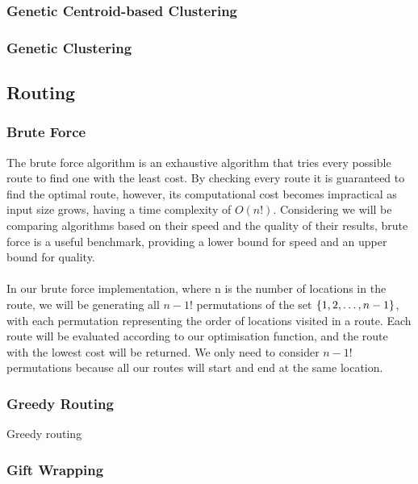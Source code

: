 \subsubsection{Genetic Centroid-based Clustering}
\subsubsection{Genetic Clustering}

\subsection{Routing}\label{subsec:routing}
\subsubsection{Brute Force}\label{subsubsec:brute-force-routing}
The brute force algorithm is an exhaustive algorithm that tries every possible route to find one with the least cost.
By checking every route it is guaranteed to find the optimal route, however, its computational cost becomes
impractical as input size grows, having a time complexity of $O(n!)$.
Considering we will be comparing algorithms based on their speed and the quality of their results, brute force is a
useful benchmark, providing a lower bound for speed and an upper bound for quality.\\
\\
In our brute force implementation, where n is the number of locations in the route, we will be generating all $n-1!$
permutations of the set $\{1, 2, \mathellipsis, n-1\}$, with each permutation representing the order of locations
visited in a route.
Each route will be evaluated according to our optimisation function, and the route with the lowest cost will be
returned.
We only need to consider $n-1!$ permutations because all our routes will start and end at the same location.\\


\subsubsection{Greedy Routing}\label{subsubsec:greedy-routing}
Greedy routing
\subsubsection{Gift Wrapping}\label{subsubsec:gift-wrapping}
